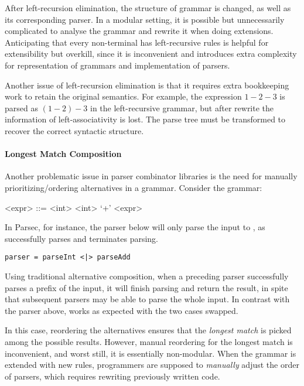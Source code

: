 After left-recursion elimination, the structure of grammar is changed,
as well as its corresponding parser. In a modular setting, it is
possible but unnecessarily complicated to analyse the grammar and
rewrite it when doing extensions. Anticipating that every non-terminal
has left-recursive rules is helpful for extensibility but overkill,
since it is inconvenient and introduces extra complexity for
representation of grammars and implementation of parsers.

Another issue of left-recursion elimination is that it requires extra
bookkeeping work to retain the original semantics. For example, the
expression $1-2-3$ is parsed as $(1-2)-3$ in the left-recursive
grammar, but after rewrite the information of left-associativity is lost. The parse tree
must be transformed to recover the correct syntactic structure.

\paragraph{Longest Match Composition} Another problematic issue
in parser combinator libraries is the need for manually prioritizing/ordering
alternatives in a grammar.
Consider the grammar:
\setlength{\grammarindent}{5em}
\begin{grammar}
<expr> ::= <int> \alt <int> `+' <expr>
\end{grammar}

In Parsec, for instance, the parser below will only parse the input  to , as  successfully parses 
and terminates parsing.

\begin{lstlisting}[language=PlainCode]
parser = parseInt <|> parseAdd
\end{lstlisting}

Using traditional alternative composition, when a preceding parser successfully parses a prefix of the input, it will finish parsing and return the result, in spite that subsequent parsers may be able to parse the whole input. In contrast with the parser above,  works as expected with the two cases swapped.

In this case, reordering the alternatives ensures that
the \emph{longest match} is picked among the possible results. However, manual reordering for the longest match is inconvenient, and worst still, it is essentially non-modular. When the grammar is extended with new rules, programmers are supposed to \emph{manually} adjust
the order of parsers, which requires rewriting previously written code.

